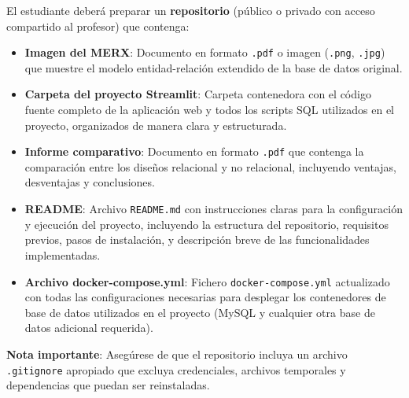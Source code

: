 \documentclass[10pt]{article}
\begin{document}
	El estudiante deberá preparar un \textbf{repositorio} (público o privado con acceso compartido al profesor) que contenga:
	
	\begin{itemize}
		\item \textbf{Imagen del MERX}: Documento en formato \texttt{.pdf} o imagen (\texttt{.png}, \texttt{.jpg}) que muestre el modelo entidad-relación extendido de la base de datos original.
		
		\item \textbf{Carpeta del proyecto Streamlit}: Carpeta contenedora con el código fuente completo de la aplicación web y todos los scripts SQL utilizados en el proyecto, organizados de manera clara y estructurada.
		
		\item \textbf{Informe comparativo}: Documento en formato \texttt{.pdf} que contenga la comparación entre los diseños relacional y no relacional, incluyendo ventajas, desventajas y conclusiones.
		
		\item \textbf{README}: Archivo \texttt{README.md} con instrucciones claras para la configuración y ejecución del proyecto, incluyendo la estructura del repositorio, requisitos previos, pasos de instalación, y descripción breve de las funcionalidades implementadas.
		
		\item \textbf{Archivo docker-compose.yml}: Fichero \texttt{docker-compose.yml} actualizado con todas las configuraciones necesarias para desplegar los contenedores de base de datos utilizados en el proyecto (MySQL y cualquier otra base de datos adicional requerida).
	\end{itemize}
	
	\vspace{2mm}
	
	\textbf{Nota importante}: Asegúrese de que el repositorio incluya un archivo \texttt{.gitignore} apropiado que excluya credenciales, archivos temporales y dependencias que puedan ser reinstaladas.
	
\end{document}
